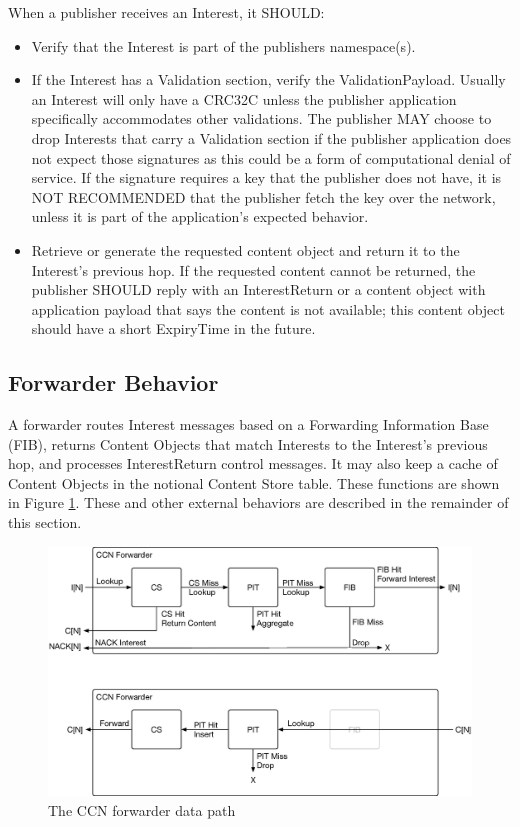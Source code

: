 \documentclass[12pt]{article}
\begin{document}
When a publisher receives an Interest, it SHOULD:

\begin{itemize}
\item Verify that the Interest is part of the publishers namespace(s).

\item If the Interest has a Validation section, verify the
    ValidationPayload.  Usually an Interest will only have a CRC32C
    unless the publisher application specifically accommodates other
    validations.  The publisher MAY choose to drop Interests that
    carry a Validation section if the publisher application does not
    expect those signatures as this could be a form of computational
    denial of service.  If the signature requires a key that the
    publisher does not have, it is NOT RECOMMENDED that the publisher
    fetch the key over the network, unless it is part of the
    application's expected behavior.

\item Retrieve or generate the requested content object and return it to
    the Interest's previous hop.  If the requested content cannot be
    returned, the publisher SHOULD reply with an InterestReturn or a
    content object with application payload that says the content is
    not available; this content object should have a short ExpiryTime
    in the future.
\end{itemize}

\subsection{Forwarder Behavior}
A forwarder routes Interest messages based on a Forwarding
Information Base (FIB), returns Content Objects that match Interests
to the Interest's previous hop, and processes InterestReturn control
messages.  It may also keep a cache of Content Objects in the
notional Content Store table.  These functions are shown in Figure \ref{fig:datapath}.
These and other external behaviors are described in the remainder of this section.

\begin{figure}
\center
\includegraphics[scale=0.5]{Figures/ccn_datapath}
\caption{The CCN forwarder data path}
\label{fig:datapath}
\end{figure}
\end{document}
